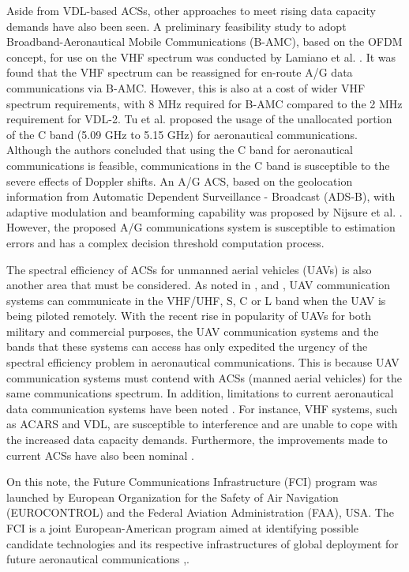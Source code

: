 Aside from VDL-based ACSs, other approaches to meet rising data capacity demands have also been seen. A preliminary feasibility study to adopt Broadband-Aeronautical Mobile Communications (B-AMC), based on the OFDM concept, for use on the VHF spectrum was conducted by Lamiano et al. \cite{lamiano2009digital}. It was found that the VHF spectrum can be reassigned for en-route A/G data communications via B-AMC. However, this is also at a cost of wider VHF spectrum requirements, with 8 MHz required for B-AMC compared to the 2 MHz requirement for VDL-2. Tu et al. \cite{tu2008proposal} proposed the usage of the unallocated portion of the C band (5.09 GHz to 5.15 GHz) for aeronautical communications. Although the authors concluded that using the C band for aeronautical communications is feasible, communications in the C band is susceptible to the severe effects of Doppler shifts. An A/G ACS, based on the geolocation information from Automatic Dependent Surveillance - Broadcast (ADS-B), with adaptive modulation and beamforming capability was proposed by Nijsure et al. \cite{nijsure2016adaptive}. However, the proposed A/G communications system is susceptible to estimation errors and has a complex decision threshold computation process.

The spectral efficiency of ACSs for unmanned aerial vehicles (UAVs) is also another area that must be considered. As noted in \cite{jacobcognitive}, \cite{kerczewski2013frequency} and \cite{mulkerin2007Lband}, UAV communication systems can communicate in the VHF/UHF, S, C or L band when the UAV is being piloted remotely. With the recent rise in popularity of UAVs for both military and commercial purposes, the UAV communication systems and the bands that these systems can access has only expedited the urgency of the spectral efficiency problem in aeronautical communications. This is because UAV communication systems must contend with ACSs (manned aerial vehicles) for the same communications spectrum. In addition, limitations to current aeronautical data communication systems have been noted \cite{neji2013survey}. For instance, VHF systems, such as ACARS and VDL, are susceptible to interference and are unable to cope with the increased data capacity demands. Furthermore, the improvements made to current ACSs have also been nominal \cite{neji2013survey}.

On this note, the Future Communications Infrastructure (FCI) program was launched by European Organization for the Safety of Air Navigation (EUROCONTROL) and the Federal Aviation Administration (FAA), USA. The FCI is a joint European-American program aimed at identifying possible candidate technologies and its respective infrastructures of global deployment for future aeronautical communications \cite{neji2013survey},\cite{eurocontrol2007communications}. 

